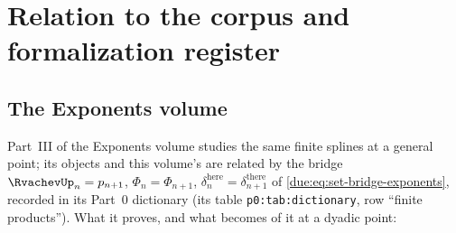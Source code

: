 \documentclass[11pt,oneside]{article}
\theoremstyle{plain}
\theoremstyle{definition}
\theoremstyle{remark}
\newcommand{\upn}[1]{\RvachevUp_{#1}}
\newcommand{\Phin}[1]{\Phi_{#1}}                            %
\begin{document}
\section{Relation to the corpus and formalization register}
\label{due:sec:register}

\subsection{The Exponents volume}
\label{due:sec:reg-exponents}

Part~III of the Exponents volume \cite{proveit-exponents} studies the same
finite splines at a general point; its objects and this volume's are
related by the bridge $\upn{n}=p_{n+1}$, $\Phin{n}=\Phi_{n+1}$,
$\delta_{n}^{\text{here}}=\delta_{n+1}^{\text{there}}$ of
\cref{due:eq:set-bridge-exponents}, recorded in its Part~0 dictionary
(its table \texttt{p0:tab:dictionary}, row ``finite products'').  What it
proves, and what becomes of it at a dyadic point:
\end{document}
